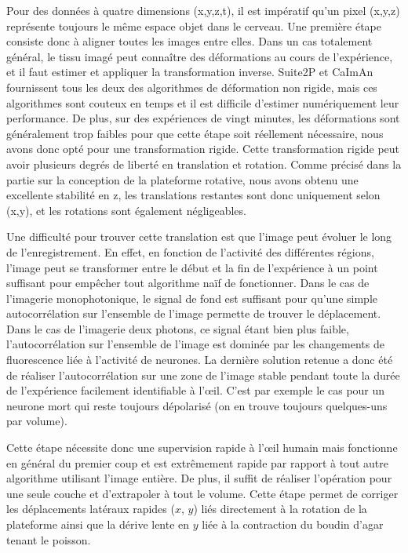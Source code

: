 Pour des données à quatre dimensions (x,y,z,t), il est impératif qu'un pixel (x,y,z) représente toujours le même espace objet dans le cerveau. Une première étape consiste donc à aligner toutes les images entre elles. Dans un cas totalement général, le tissu imagé peut connaître des déformations au cours de l'expérience, et il faut estimer et appliquer la transformation inverse. Suite2P et CaImAn fournissent tous les deux des algorithmes de déformation non rigide, mais ces algorithmes sont couteux en temps et il est difficile d'estimer numériquement leur performance. De plus, sur des expériences de vingt minutes, les déformations sont généralement trop faibles pour que cette étape soit réellement nécessaire, nous avons donc opté pour une transformation rigide. Cette transformation rigide peut avoir plusieurs degrés de liberté en translation et rotation. Comme précisé dans la partie sur la conception de la plateforme rotative, nous avons obtenu une excellente stabilité en z, les translations restantes sont donc uniquement selon (x,y), et les rotations sont également négligeables. 

Une difficulté pour trouver cette translation est que l'image peut évoluer le long de l'enregistrement. En effet, en fonction de l'activité des différentes régions, l'image peut se transformer entre le début et la fin de l'expérience à un point suffisant pour empêcher tout algorithme naïf de fonctionner. Dans le cas de l'imagerie monophotonique, le signal de fond est suffisant pour qu'une simple autocorrélation sur l'ensemble de l'image permette de trouver le déplacement. Dans le cas de l'imagerie deux photons, ce signal étant bien plus faible, l'autocorrélation sur l'ensemble de l'image est dominée par les changements de fluorescence liée à l'activité de neurones. La dernière solution retenue a donc été de réaliser l'autocorrélation sur une zone de l'image stable pendant toute la durée de l'expérience facilement identifiable à l'œil. C'est par exemple le cas pour un neurone mort qui reste toujours dépolarisé (on en trouve toujours quelques-uns par volume).

Cette étape nécessite donc une supervision rapide à l'œil humain mais fonctionne en général du premier coup et est extrêmement rapide par rapport à tout autre algorithme utilisant l'image entière. De plus, il suffit de réaliser l'opération pour une seule couche et d'extrapoler à tout le volume. Cette étape permet de corriger les déplacements latéraux rapides ($x$, $y$) liés directement à la rotation de la plateforme ainsi que la dérive lente en $y$ liée à la contraction du boudin d'agar tenant le poisson.

